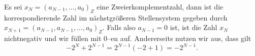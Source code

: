 Es sei $x_{N} = (a_{N-1}, \dots, a_0)_{Z}$ eine Zweierkomplementzahl, dann ist die korrespondierende Zahl im nächstgrößeren Stellensystem gegeben durch $x_{N+1} = (a_{N-1}, a_{N-1}, \dots, a_0)_{Z}$. Falls also $a_{N-1} = 0$ ist, ist die Zahl $x_{N}$ nichtnegativ und wir füllen mit $0$--en auf. Andererseits nutzen wir aus, dass gilt
$$
	-2^{N} + 2^{N-1} = 2^{N-1}(-2 + 1) = - 2^{N-1}.
$$
